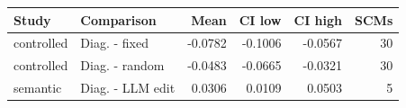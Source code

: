 \begingroup\setlength{\tabcolsep}{3pt}\small
\begin{tabular}{llrrrr}
\toprule
Study & Comparison & Mean & CI low & CI high & SCMs \\
\midrule
controlled & Diag. - fixed & -0.0782 & -0.1006 & -0.0567 & 30 \\
controlled & Diag. - random & -0.0483 & -0.0665 & -0.0321 & 30 \\
semantic & Diag. - LLM edit & 0.0306 & 0.0109 & 0.0503 & 5 \\
\bottomrule
\end{tabular}
\endgroup
